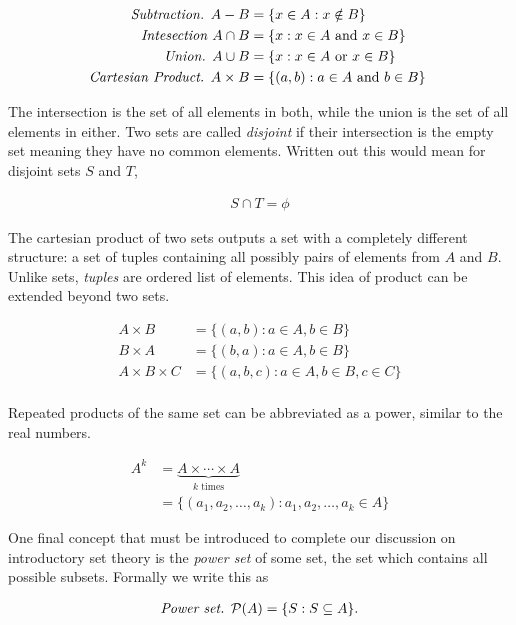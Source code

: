 \documentclass{report}
\begin{document}
\begin{align*}
	\emph{Subtraction. } A - B &= \{ x \in A : x \notin B \} \\
	\emph{Intesection } A \cap B &= \{ x : x \in A \text{ and } x \in B \} \\ 
	\emph{Union. } A  \cup B &= \{ x : x \in A \text{ or } x \in B \} \\
	\emph{Cartesian Product. } A  \times B &= \{ (a, b) : a \in A \text{ and } b \in B \} \
\end{align*}

The intersection is the set of all elements in both, while the union is the set of all elements in either. Two sets are called \emph{disjoint} if their intersection is the empty set meaning they have no common elements. Written out this would mean for disjoint sets $S$ and $T$,

\begin{align*}
	S \cap T = \phi
\end{align*}

The cartesian product of two sets outputs a set with a completely different structure: a set of tuples containing all possibly pairs of elements from $A$ and $B$. Unlike sets, \emph{tuples}  are ordered list of elements. This idea of product can be extended beyond two sets.

\begin{align*}
	A \times B &= \{ (a, b) : a \in A, b \in B \} \\
	B \times A &= \{ (b, a) : a \in A, b \in B \} \\
	A \times B \times C &= \{ (a, b, c) : a \in A, b \in B, c \in C \} \\
\end{align*}

Repeated products of the same set can be abbreviated as a power, similar to the real numbers.

\begin{align*}
	A^k &= \underbrace{A \times \cdots \times A}_\text{$k$ times} \\
	&= \{ (a_1, a_2, \dots, a_k) : a_1, a_2, \dots, a_k \in A \}
\end{align*} 

One final concept that must be introduced to complete our discussion on introductory set theory is the \emph{power set}  of some set, the set which contains all possible subsets. Formally we write this as

\begin{align*}
	\emph{Power set. } \mathcal{P}(A) = \{ S : S \subseteq A \}.
\end{align*}
\end{document}
